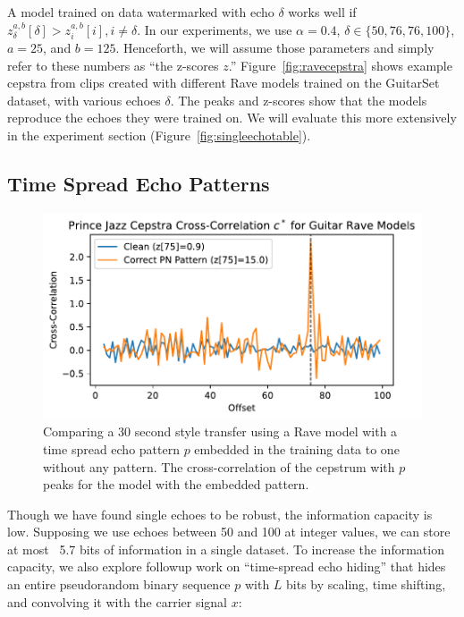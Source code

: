 \documentclass[letterpaper]{article} %
\begin{document}
A model trained on data watermarked with echo $\delta$ works well if $z^{a,b}_{\delta}[\delta] > z^{a,b}_{i}[i], i \neq \delta$.  In our experiments, we use $\alpha = 0.4$, $\delta \in \{50, 76, 76, 100\}$, $a=25$, and $b=125$.  Henceforth, we will assume those parameters and simply refer to these numbers as ``the z-scores $z$.''  Figure~\ref{fig:ravecepstra} shows example cepstra from clips created with different Rave\cite{caillon2021rave} models trained on the GuitarSet \cite{xi2018guitarset} dataset, with various echoes $\delta$.  The peaks and z-scores show that the models reproduce the echoes they were trained on.  We will evaluate this more extensively in the experiment section (Figure~\ref{fig:singleechotable}).

\subsection{Time Spread Echo Patterns}

\begin{figure}
    \centering
    \includegraphics[width=\columnwidth]{figs/RavePNCepstra.pdf}
    \caption{Comparing a 30 second style transfer using a Rave model with a time spread echo pattern $p$ embedded in the training data to one without any pattern.  The cross-correlation of the cepstrum with $p$ peaks for the model with the embedded pattern. }
    \label{fig:ravepncepstra}
\end{figure}

Though we have found single echoes to be robust, the information capacity is low.  Supposing we use echoes between 50 and 100 at integer values, we can store at most ~5.7 bits of information in a single dataset.  To increase the information capacity, we also explore followup work on ``time-spread echo hiding'' \cite{ko2005time} that hides an entire pseudorandom binary sequence $p$ with $L$ bits by scaling, time shifting, and convolving it with the carrier signal $x$:
\end{document}

